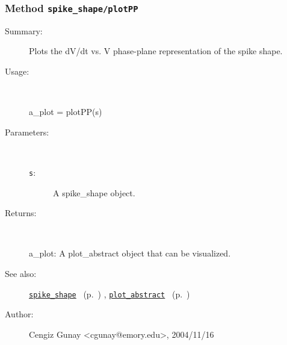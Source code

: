 \subsubsection[Method \texttt{plotPP}]{Method \texttt{spike\_shape/plotPP}}%
%
\label{ref_spike_shape__plotPP}%
\hypertarget{ref_spike_shape__plotPP}{}%
\begin{description}
\item[Summary:]Plots the dV/dt vs. V phase-plane representation of the spike shape.
%
\item[Usage:]~%
\begin{lyxcode}%
a\_plot = plotPP(s)
%
\end{lyxcode}%
%
%
\item[Parameters:]~
\begin{description}%
\item[\texttt{s}:]
 A spike\_shape object.
\end{description}%
%
\item[Returns:
]~

	a\_plot: A plot\_abstract object that can be visualized.
%
%
\item[See also:]%
\hyperlink{ref_spike_shape}{\texttt{spike\_shape}}%
\ (p.~\pageref{ref_spike_shape})%
%
, \hyperlink{ref_plot_abstract}{\texttt{plot\_abstract}}%
\ (p.~\pageref{ref_plot_abstract})%
%
%
\item[Author:]%
Cengiz Gunay <cgunay@emory.edu>, 2004/11/16
%
\end{description}
\methodline%
